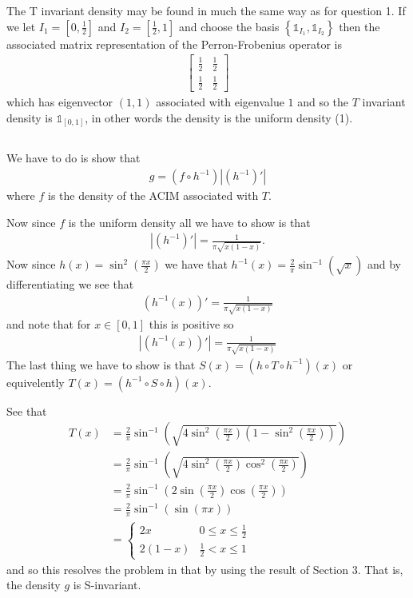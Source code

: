 \documentclass{unswmaths}
\begin{document}
The T invariant density may be found in much the same way as for question 1.
If we let $ I_1 = \left[0,\frac{1}{2}\right] $ and $ I_2 = \left[ \frac{1}{2}, 1 \right] $ and choose the basis
  $\left\{ \mathds{1}_{I_1}, \mathds{1}_{I_2} \right\} $ then the associated matrix representation of the Perron-Frobenius operator is 
\begin{align}
  \left[ \begin{array}{cc} \frac{1}{2} & \frac{1}{2} \\ \frac{1}{2} & \frac{1}{2} \end{array} \right]
\end{align}
which has eigenvector $ (1,1) $ associated with eigenvalue $ 1 $ and so the $ T $ invariant density is $ \mathds{1}_{[0,1]} $, in other words the density is the uniform density (1).

\subsection{}
We have to do is show that 
\begin{align}
  g = (f \circ h^{-1})|\left( h^{-1} \right)'|
\end{align}
where $ f $ is the density of the ACIM associated with $ T $.

Now since $ f $ is the uniform density all we have to show is that
\begin{align}
 |\left( h^{-1} \right)'| = \frac{1}{\pi\sqrt{x(1-x)}}.
\end{align}
Now since $ h(x) = \sin^2(\frac{\pi x}{2}) $ we have that $ h^{-1}(x) = \frac{2}{\pi} \sin^{-1}(\sqrt{x}) $ and by differentiating we see that
\begin{align}
  \left( h^{-1}(x) \right)' = \frac{1}{\pi\sqrt{x(1-x)}}
\end{align}
and note that for $ x \in [0,1] $ this is positive so 
\begin{align}
| (h^{-1}(x))' | = \frac{1}{\pi\sqrt{x(1-x)}}
\end{align}
The last thing we have to show is that $ S(x) = \left( h \circ T \circ h^{-1} \right)(x) $ or equivelently $ T(x) = \left(h^{-1} \circ S \circ h \right)(x) $.

See that
\begin{align}
  T(x) &= \frac{2}{\pi} \sin^{-1}\left( \sqrt{4\sin^2\left(\frac{\pi  x}{2}\right)\left(1-\sin^2\left(\frac{\pi  x}{2}\right)\right) } \right) \\
    &= \frac{2}{\pi} \sin^{-1}\left( \sqrt{4\sin^2\left(\frac{\pi  x}{2}\right)\cos^2\left(\frac{\pi  x}{2}\right) } \right) \\
    &= \frac{2}{\pi} \sin^{-1}\left( 2 \sin\left(\frac{\pi  x}{2}\right)\cos\left(\frac{\pi  x}{2}\right) \right) \\
    &= \frac{2}{\pi} \sin^{-1}\left(  \sin\left(\pi  x\right)\right) \\
    &= \begin{cases} 2x & 0 \leq x \leq \frac{1}{2} \\ 2(1-x)  & \frac{1}{2} < x \leq 1 \end{cases}
\end{align}
and so this resolves the problem in that by using the result of Section 3.
That is, the density $ g $ is S-invariant.
\end{document}
